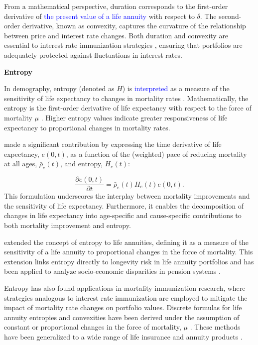 \documentclass[12pt]{article}
\newcommand{\revision}[1]{\textcolor{blue}{#1}}
\begin{document}
From a mathematical perspective, duration corresponds to the first-order derivative of \textcolor{blue}{the present value of a life annuity} with respect to $\delta$. The second-order derivative, known as convexity, captures the curvature of the relationship between price and interest rate changes. Both duration and convexity are essential to interest rate immunization strategies \citep{redington1951papers,fisher1971coping,shiu1990redington,santomero1997financial,courtois2007immunization}, ensuring that portfolios are adequately protected against fluctuations in interest rates.

\textbf{Entropy}

In demography, entropy (denoted as $H$) is \textcolor{blue}{interpreted} as a measure of the sensitivity of life expectancy to changes in mortality rates \citep{leser1955variations,keyfitz1977difference,demetrius1974demographic,goldman1986new, aburto2019threshold}. Mathematically, the entropy is the first-order derivative of life expectancy with respect to the force of mortality $\mu$ \revision{\citep{keyfitz1977difference}}. Higher entropy values indicate greater responsiveness of life expectancy to proportional changes in mortality rates.

\citet{Vaupel2003} made a significant contribution by expressing the time derivative of life expectancy, $e(0, t)$, \color{blue}as a function of the (weighted) pace of reducing mortality at all ages, $\bar{\rho}_e(t)$, and entropy, $H_e(t)$:

\begin{equation}\label{eq:lifeexpdecomp}
	\dfrac{\partial e(0,t)}{\partial t} = \bar{\rho}_e(t) H_e(t) e(0,t).
\end{equation}
\color{black}
This formulation underscores the interplay between mortality improvements and the sensitivity of life expectancy. Furthermore, it enables the decomposition of changes in life expectancy into age-specific and cause-specific contributions to both mortality improvement and entropy.

\citet{Haberman2011} extended the concept of entropy to life annuities, defining it as a measure of the sensitivity of a life annuity to proportional changes in the force of mortality. This extension links entropy directly to longevity risk in life annuity portfolios \citep{rabitti2020mortality} and has been applied to analyze socio-economic disparities in pension systems \citep{alvarez2021linking}.

Entropy has also found applications in mortality-immunization research, where strategies analogous to interest rate immunization are employed to mitigate the impact of mortality rate changes on portfolio values. Discrete formulas for life annuity entropies and convexities have been derived under the assumption of constant or proportional changes in the force of mortality, $\mu$ \citep{wang2010optimal,tsai2011actuarial,Tsai2013a,Li2011}. These methods have been generalized to a wide range of life insurance and annuity products \citep{li2012key,Wong2015,Luciano2015,levantesi2018natural}.
\end{document}
